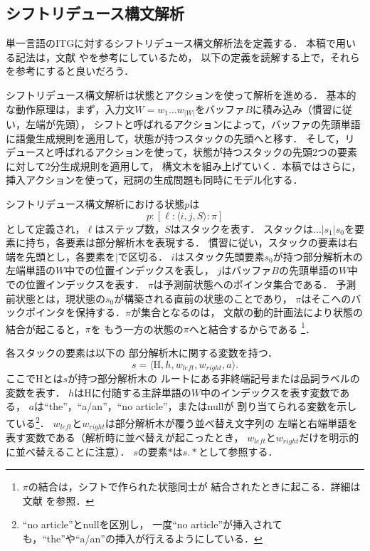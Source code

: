 \documentclass[japanese]{jnlp_1.4}
\begin{document}
\subsection{シフトリデュース構文解析}
\label{sec:sr}

単一言語のITGに対するシフトリデュース構文解析法を定義する．
本稿で用いる記法は，文献 \cite{Huang:10}や\cite{Zhang:11}を参考にしているため，
以下の定義を読解する上で，それらを参考にすると良いだろう．

シフトリデュース構文解析は状態とアクションを使って解析を進める．
基本的な動作原理は，まず，入力文$W=w_{1}\dots w_{|W|}$をバッファ$B$に積み込み（慣習に従い，左端が先頭），
シフトと呼ばれるアクションによって，バッファの先頭単語に語彙生成規則を適用して，状態が持つスタックの先頭へと移す．
そして，リデュースと呼ばれるアクションを使って，状態が持つスタックの先頭2つの要素に対して2分生成規則を適用して，
構文木を組み上げていく．本稿ではさらに，挿入アクションを使って，冠詞の生成問題も同時にモデル化する．

シフトリデュース構文解析における状態$p$は
\[
p: [\ell: \langle i, j, S\rangle: \pi]
\]
として定義され，$\ell$はステップ数，$S$はスタックを表す．
スタックは$\dots|s_{1}|s_{0}$を要素に持ち，各要素は部分解析木を表現する．
慣習に従い，スタックの要素は右端を先頭とし，各要素を$|$で区切る．
$i$はスタック先頭要素$s_{0}$が持つ部分解析木の左端単語の$W$中での位置インデックスを表し，
$j$はバッファ$B$の先頭単語の$W$中での位置インデックスを表す．
$\pi$は予測前状態へのポインタ集合である．
予測前状態とは，現状態の$s_{0}$が構築される直前の状態のことであり，
$\pi$はそこへのバックポインタを保持する．$\pi$が集合となるのは，
文献\cite{Huang:10}の動的計画法により状態の結合が起こると，$\pi$を
もう一方の状態の$\pi$へと結合するからである
\footnote{$\pi$の結合は，シフトで作られた状態同士が
結合されたときに起こる．詳細は文献 \cite{Huang:10}を参照．}．

各スタックの要素は以下の
部分解析木に関する変数を持つ．
\[
s=\langle\text{H},h,w_{left},w_{right},a\rangle.
\]
ここでHとは$s$が持つ部分解析木の
ルートにある非終端記号または品詞ラベルの変数を表す．
$h$はHに付随する主辞単語の$W$中のインデックスを表す変数である，
$a$は``the''，``a/an''，``no article''，またはnullが
割り当てられる変数を示している\footnote{``no article''とnullを区別し，
一度``no article''が挿入されても，``the''や``a/an''の挿入が行えるようにして\linebreak いる．}．
$w_{left}$と$w_{right}$は部分解析木が覆う並べ替え文字列の
左端と右端単語を表す変数である（解析時に並べ替えが起こったとき，
$w_{left}$と$w_{right}$だけを明示的に並べ替えることに注意）．
$s$の要素$*$は$s.*$として参照する．
\end{document}
